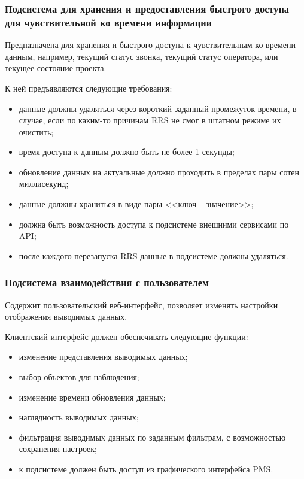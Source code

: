 \subsubsection{Подсистема для хранения и предоставления быстрого доступа для чувствительной ко времени информации}

Предназначена для хранения и быстрого доступа к чувствительным ко времени данным,
например, текущий статус звонка, текущий статус оператора, или текущее состояние проекта.

К ней предъявляются следующие требования:
\begin{itemize}
    \item данные должны удаляться через короткий заданный промежуток времени, в случае,
    если по каким-то причинам RRS не смог в штатном режиме их очистить;
    \item время доступа к данным должно быть не более 1 секунды;
    \item обновление данных на актуальные должно проходить в пределах пары сотен миллисекунд;
    \item данные должны храниться в виде пары <<ключ -- значение>>;
    \item должна быть возможность доступа к подсистеме внешними сервисами по API;
    \item после каждого перезапуска RRS данные в подсистеме должны удаляться.
\end{itemize}

\subsubsection{Подсистема взаимодействия с пользователем}
\label{subsubsec:подсистема-взаимодействия-с-пользователем}

Содержит пользовательский веб-интерфейс, позволяет изменять настройки отображения выводимых данных.

Клиентский интерфейс должен обеспечивать следующие функции:
\begin{itemize}
    \item изменение представления выводимых данных;
    \item выбор объектов для наблюдения;
    \item изменение времени обновления данных;
    \item наглядность выводимых данных;
    \item фильтрация выводимых данных по заданным фильтрам, с возможностью сохранения настроек;
    \item к подсистеме должен быть доступ из графического интерфейса PMS\@.
\end{itemize}

